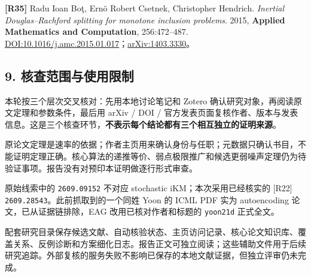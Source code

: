 \documentclass[
  chinese,
  10pt,
  a4paper,
]{article}
\begin{document}
\textbf{{[}R35{]}} Radu Ioan Boţ, Ernö Robert Csetnek, Christopher
Hendrich. \emph{Inertial Douglas--Rachford splitting for monotone
inclusion problems}. 2015, \textbf{Applied Mathematics and Computation},
256:472--487.
\href{https://doi.org/10.1016/j.amc.2015.01.017}{DOI:10.1016/j.amc.2015.01.017}；\href{https://arxiv.org/abs/1403.3330}{arXiv:1403.3330}。

\subsection{9.
核查范围与使用限制}\label{ux6838ux67e5ux8303ux56f4ux4e0eux4f7fux7528ux9650ux5236}

本轮按三个层次交叉核对：先用本地讨论笔记和 Zotero
确认研究对象，再阅读原文定理和参数条件，最后用 arXiv / DOI /
官方发表页面复核作者、版本与发表信息。这是三个核查环节，\textbf{不表示每个结论都有三个相互独立的证明来源}。

原论文定理是速率的依据；作者主页用来确认身份与任职；元数据只确认书目，不能证明定理正确。核心算法的递推等价、弱点极限推广和候选更弱噪声定理仍为待验证事项。报告没有对预印本证明做逐行形式审查。

原始线索中的 \texttt{2609.09152} 不对应 stochastic
iKM；本次采用已经核实的 {[}R22{]}
\texttt{2609.28543}。此前抓取到的一个同姓 Yoon 的 ICML PDF 实为
autoencoding 论文，已从证据链排除，EAG 改用已核对作者和标题的
\texttt{yoon21d} 正式全文。

配套研究目录保存候选文献、自动核验状态、主页访问记录、核心论文知识库、覆盖关系、反例诊断和方案细化日志。报告正文可独立阅读；这些辅助文件用于后续研究追踪。外部复核的服务失败不影响已保存的本地文献证据，但独立评审仍未完成。
\end{document}
